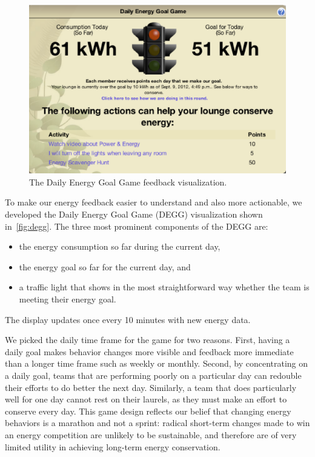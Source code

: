 \documentclass[10pt, conference, compsocconf]{IEEEtran-old}
\begin{document}
\begin{figure}[!tb]
	\centering
	\includegraphics[width=\columnwidth]{degg.eps}
	\caption{The Daily Energy Goal Game feedback visualization.}
	\label{fig:degg}
\end{figure}

To make our energy feedback easier to understand and also more actionable, we developed the Daily Energy Goal Game (DEGG) visualization shown in~\autoref{fig:degg}. The three most prominent components of the DEGG are:
\begin{itemize}
	\item the energy consumption so far during the current day,
	\item the energy goal so far for the current day, and
	\item a traffic light that shows in the most straightforward way whether the team is meeting their energy goal.
\end{itemize}
The display updates once every 10 minutes with new energy data.

We picked the daily time frame for the game for two reasons. First, having a daily goal makes behavior changes more visible and feedback more immediate than a longer time frame such as weekly or monthly. Second, by concentrating on a daily goal, teams that are performing poorly on a particular day can redouble their efforts to do better the next day. Similarly, a team that does particularly well for one day cannot rest on their laurels, as they must make an effort to conserve every day. This game design reflects our belief that changing energy behaviors is a marathon and not a sprint: radical short-term changes made to win an energy competition are unlikely to be sustainable, and therefore are of very limited utility in achieving long-term energy conservation.
\end{document}
